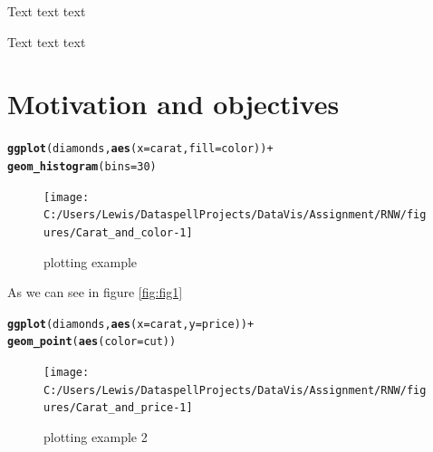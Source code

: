 \documentclass[12pt]{report}\usepackage[]{graphicx}\usepackage[]{xcolor}
\makeatletter
\newcommand{\hlnum}[1]{\textcolor[rgb]{0.686,0.059,0.569}{#1}}%
\newcommand{\hlopt}[1]{\textcolor[rgb]{0,0,0}{#1}}%
\newcommand{\hlstd}[1]{\textcolor[rgb]{0.345,0.345,0.345}{#1}}%
\newcommand{\hlkwc}[1]{\textcolor[rgb]{0.333,0.667,0.333}{#1}}%
\newcommand{\hlkwd}[1]{\textcolor[rgb]{0.737,0.353,0.396}{\textbf{#1}}}%
\newenvironment{kframe}{%
 \def\at@end@of@kframe{}%
 \ifinner\ifhmode%
  \def\at@end@of@kframe{\end{minipage}}%
  \begin{minipage}{\columnwidth}%
 \fi\fi%
 \def\FrameCommand##1{\hskip\@totalleftmargin \hskip-\fboxsep
 \colorbox{shadecolor}{##1}\hskip-\fboxsep
     \hskip-\linewidth \hskip-\@totalleftmargin \hskip\columnwidth}%
 \MakeFramed {\advance\hsize-\width
   \@totalleftmargin\z@ \linewidth\hsize
   \@setminipage}}%
 {\par\unskip\endMakeFramed%
 \at@end@of@kframe}
\newenvironment{knitrout}{}{} %
\makeatother
\begin{document}
    Text text text

    Text text text

    \pagebreak

    \chapter*{Motivation and objectives}\label{ch:sec1}

\begin{knitrout}
\color{fgcolor}\begin{kframe}
\begin{alltt}
\hlkwd{ggplot}\hlstd{(diamonds,} \hlkwd{aes}\hlstd{(}\hlkwc{x} \hlstd{= carat,} \hlkwc{fill} \hlstd{= color))} \hlopt{+}
  \hlkwd{geom_histogram}\hlstd{(}\hlkwc{bins} \hlstd{=} \hlnum{30}\hlstd{)}
\end{alltt}
\end{kframe}\begin{figure}[H]

{\centering \texttt{[image: C:/Users/Lewis/DataspellProjects/DataVis/Assignment/RNW/figures/Carat\_and\_color-1]} 

}

\caption{\label{fig:fig1}plotting example}\label{fig:Carat and color}
\end{figure}

\end{knitrout}

As we can see in figure \ref{fig:fig1}

    \pagebreak
    
\begin{knitrout}
\color{fgcolor}\begin{kframe}
\begin{alltt}
\hlkwd{ggplot}\hlstd{(diamonds,} \hlkwd{aes}\hlstd{(}\hlkwc{x} \hlstd{= carat,} \hlkwc{y} \hlstd{= price))} \hlopt{+}
\hlkwd{geom_point}\hlstd{(}\hlkwd{aes}\hlstd{(}\hlkwc{color} \hlstd{= cut))}
\end{alltt}
\end{kframe}\begin{figure}[H]

{\centering \texttt{[image: C:/Users/Lewis/DataspellProjects/DataVis/Assignment/RNW/figures/Carat\_and\_price-1]} 

}

\caption{\label{fig:fig2}plotting example 2}\label{fig:Carat and price}
\end{figure}

\end{knitrout}
\end{document}
